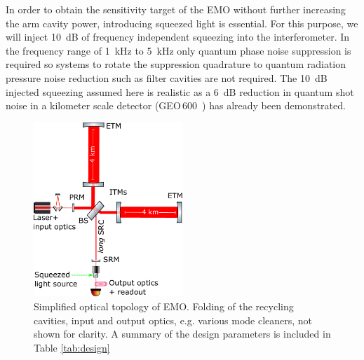 \documentclass[prx,superscriptaddress,twocolumn,nopreprintnumbers,floatfix,nofootinbib]{revtex4}
\begin{document}
In order to obtain the sensitivity target of the EMO without further increasing the arm cavity power, introducing squeezed light is essential. For this purpose, we will inject 10~dB of frequency independent squeezing into the interferometer. In the frequency range of 1~kHz to 5~kHz only quantum phase noise suppression is required so systems to rotate the suppression quadrature to quantum radiation pressure noise reduction such as filter cavities are not required. The 10~dB injected squeezing assumed here is realistic as a 6~dB reduction in quantum shot noise in a kilometer scale detector (GEO\,600~\cite{squeezeRecord_GEO2018}) has already been demonstrated. 

\begin{figure}[htb]
\centering
\includegraphics[width=0.5\textwidth]{GenGWDoverviewLongSRC}
\caption{Simplified optical topology of EMO. Folding of the recycling cavities, input and output optics, e.g. various mode cleaners, not shown for clarity. A summary of the design parameters is included in Table \ref{tab:design}
}
\label{detector_design}
\end{figure}
\end{document}
